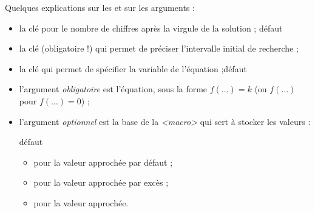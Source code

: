 \begin{cautionblock}
Quelques explications sur les  et sur les arguments :

\begin{itemize}
	\item la clé  pour le nombre de chiffres après la virgule de la solution ; \hfill{}défaut 
	\item la clé (obligatoire !)  qui permet de préciser l'intervalle initial de recherche ;
	\item la clé  qui permet de spécifier la variable de l'équation ;\hfill{}défaut 
	\item l'argument \textit{obligatoire} est l'équation, sous la forme $f(\ldots)=k$ (ou $f(\ldots)$ pour $f(\ldots)=0$) ;
	\item l'argument \textit{optionnel} est la base de la \textit{<macro>} qui sert à stocker les valeurs :
	
	\hfill{}défaut 
	\begin{itemize}
			\item {} pour la valeur approchée par défaut ;
			\item {} pour la valeur approchée par excès ;
			\item {} pour la valeur approchée.
		\end{itemize}
\end{itemize}
\vspace*{-\baselineskip}\leavevmode
\end{cautionblock}

